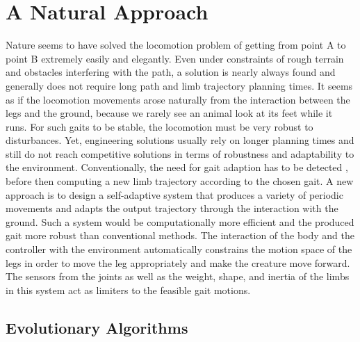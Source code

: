 \documentclass[main]{subfiles}
\begin{document}
\section{A Natural Approach}

Nature seems to have solved the locomotion problem of getting from point A to point B extremely easily and elegantly. %
%
Even under constraints of rough terrain and obstacles interfering with the path, a solution is nearly always found and generally does not require long path and limb trajectory planning times. %
%
It seems as if the locomotion movements arose naturally from the interaction between the legs and the ground, because we rarely see an animal look at its feet while it runs. %
%
For such gaits to be stable, the locomotion must be very robust to disturbances. %
%
Yet, engineering solutions usually rely on longer planning times and still do not reach competitive solutions in terms of robustness and adaptability to the environment. %
%
Conventionally, the need for gait adaption has to be detected , before then computing a new limb trajectory according to the chosen gait. %
%
A new approach is to design a self-adaptive system that produces a variety of periodic movements and adapts the output trajectory through the interaction with the ground. %
%
Such a system would be computationally more efficient and the produced gait more robust than conventional methods. %
%
The interaction of the body and the controller with the environment automatically constrains the motion space of the legs in order to move the leg appropriately and make the creature move forward. %
%
The sensors from the joints as well as the weight, shape, and inertia of the limbs in this system act as limiters to the feasible gait motions.

\subsection{Evolutionary Algorithms}
\end{document}
